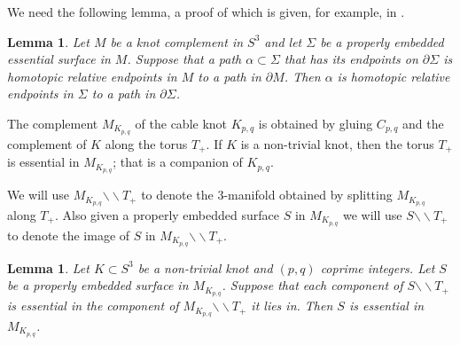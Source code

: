 \documentclass[11pt]{amsart}
\newtheorem{lemma}[theorem]{Lemma}
\theoremstyle{definition}
\newcommand{\M}{M_{K_{p,q}}}
\newcommand{\cut}{{\backslash \backslash}}
\newcommand{\C}{{C_{p, q}}}
\newcommand{\K}{{K_{p, q}}}
\begin{document}
We need the following lemma, a proof of which is given, for example, in   \cite[Proposition 1.1]{KS}.

\begin{lemma} \label{basic} Let $M$ be a knot complement in $S^3$ and let $\Sigma$ be a properly embedded essential surface 
in $M$. Suppose that a path $\alpha \subset \Sigma$ that has its endpoints on $\partial \Sigma$ is homotopic relative endpoints in $M$
to a path in $\partial M$. Then $\alpha$ is homotopic relative endpoints in $\Sigma$ 
to a path in $\partial \Sigma$.

\end{lemma}

The complement $\M$ of the cable knot  $\K$ is obtained by gluing $\C$ and the complement of $K$
along the torus $T_+$.  If $K$ is a non-trivial knot,  then the  torus $T_{+}$ is essential in $\M$; that is a companion
of $\K$.

We will use $\M \cut T_{+}$ to denote the 3-manifold obtained by splitting
$\M$ along $T_{+}$. Also given a  properly embedded surface $S$ in $\M$ we will use $S\cut T_{+}$
to denote the image of $S$ in $\M \cut T_{+}$.


\begin{lemma}\label{components} Let $K \subset S^3$  be a non-trivial knot and $(p, q)$ coprime  integers.
Let $S$ be a properly embedded surface in $\M$. Suppose that each component of  $S \cut T_{+}$ is essential in the component of $\M \cut T_{+}$ it lies in. Then $S$ is essential in $\M$.

\end{lemma}
\end{document}
